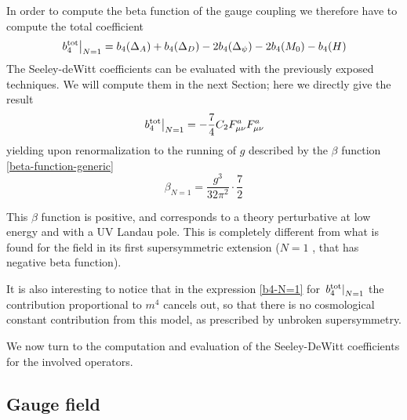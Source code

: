In order to compute the beta function of the gauge coupling we therefore have to compute the total coefficient
\begin{equation}\label{b4-generic-N=1}
\left.b_4^{ \text{tot} }\right|_{ N = 1 }
	=
b_4(\Delta_A)
+
b_4(\Delta_D)
-
2 b_4(\Delta_\psi)
-
2 b_4(M_0)
-
 b_4(H)
\end{equation}
The Seeley-deWitt coefficients can be evaluated with the  previously exposed techniques. We will compute them in the next Section; here we directly give the result
\begin{equation}\label{b4-N=1}
\left.b_4^{ \text{tot} }\right|_{ N = 1 }
	=
-\frac{7}{4} C_2 F_{\mu\nu}^a F_{\mu\nu}^a
\end{equation}
yielding upon renormalization to the running of $g$ described by the $\beta$ function \eqref{beta-function-generic}
\begin{equation}
\beta_{N=1} = 
\frac{g^3}{32 \pi^2} \cdot \frac{7}{2}
\end{equation}


This $\beta$ function is positive, and corresponds to a theory perturbative at low energy and with a UV Landau pole. This is completely different from what is found for the \ym{} field in its first supersymmetric extension (\ie $N=1$ \sym{}, that has negative beta function).


It is also interesting to notice that in the expression \eqref{b4-N=1} for $\left.b_4^{ \text{tot} }\right|_{ N = 1 }$ the contribution proportional to $m^4$ cancels out, so that there is no cosmological constant contribution from this model, as prescribed by unbroken supersymmetry.



We now turn to the computation and evaluation of the Seeley-DeWitt coefficients for the involved operators. 




\subsection{Gauge field}

